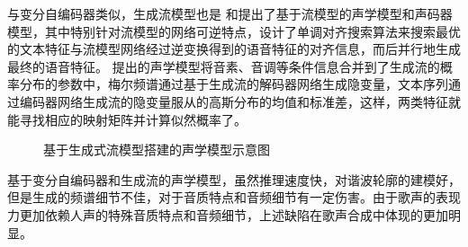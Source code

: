 与变分自编码器类似，生成流模型也是
\citet{waveglow}和\citet{kim2020glow}提出了基于流模型的声学模型和声码器模型，其中\citet{kim2020glow}特别针对流模型的网络可逆特点，设计了单调对齐搜索算法来搜索最优的文本特征与流模型网络经过逆变换得到的语音特征的对齐信息，而后并行地生成最终的语音特征。
\citet{kim2020glow}提出的声学模型将音素、音调等条件信息合并到了生成流的概率分布的参数中，梅尔频谱通过基于生成流的解码器网络生成隐变量，文本序列通过编码器网络生成流的隐变量服从的高斯分布的均值和标准差，这样，两类特征就能寻找相应的映射矩阵并计算似然概率了。
\begin{figure}[htbp]
  \caption{基于生成式流模型搭建的声学模型示意图}
\end{figure}
基于变分自编码器和生成流的声学模型，虽然推理速度快，对谐波轮廓的建模好，但是生成的频谱细节不佳，对于音质特点和音频细节有一定伤害。由于歌声的表现力更加依赖人声的特殊音质特点和音频细节，上述缺陷在歌声合成中体现的更加明显。
